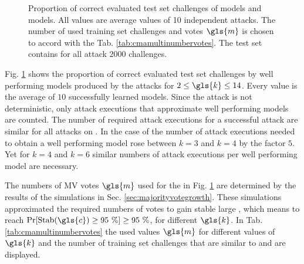 \begin{figure}[ht]
	\fi
\fi
\caption[Proportion of correct evaluated test set challenges for \acs{XOR} Arbiter \puf models and Majority \acs{XOR} Arbiter \puf models]{Proportion of correct evaluated test set challenges of \xpuf models and \mxpuf models. All values are average values of 10 independent attacks. The number of used training set challenges and votes $\gls{m}$ is chosen to accord with the Tab. \ref{tab:cmamultinumbervotes}. The test set contains for all attack $2000$ challenges.}
\label{fig:cmamultiattackmodelperformance}
\end{figure}

Fig. \ref{fig:cmamultiattackmodelperformance} shows the proportion of correct evaluated test set challenges by well performing models produced by the attacks for $2 \le \gls{k} \le 14$.
Every value is the average of $10$ successfully learned models.
Since the attack is not deterministic, only attack executions that approximate well performing models are counted.
The number of required attack executions for a successful attack are similar for all attacks on \xpufs.
In the case of \mxpufs the number of attack executions needed to obtain a well performing model rose between $k = 3$ and $k = 4$ by the factor $5$.
Yet for $k = 4$ and $k = 6$ similar numbers of attack executions per well performing model are necessary.

The numbers of \ac{MV} votes $\gls{m}$ used for the \mxpufs in Fig. \ref{fig:cmamultiattackmodelperformance} are determined by the results of the simulations in Sec. \ref{sec:majorityvotegrowth}.
These simulations approximated the required numbers of votes to gain stable large \mxpufs, which means to reach $\Pr[\protect\Stab(\gls{c}) \ge 95\ \%] \ge 95\ \%$, for different $\gls{k}$.
In Tab. \ref{tab:cmamultinumbervotes} the used values $\gls{m}$ for different values of $\gls{k}$ and the number of training set challenges that are similar to \xpufs and \mxpufs are displayed.

